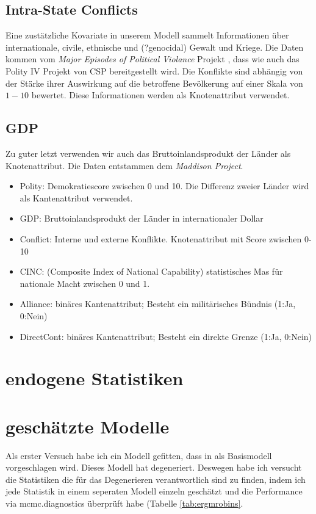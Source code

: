 \documentclass[a4paper,ngerman,oneside,titlepage,bibliography=totoc,11pt]{scrreprt}
\begin{document}
\subsection{Intra-State Conflicts}
Eine zustätzliche Kovariate in unserem Modell sammelt Informationen über internationale, civile, ethnische und (?genocidal) Gewalt und Kriege. Die Daten kommen vom \emph{Major Episodes of Political Violance} Projekt \cite{conflict}, dass wie auch das Polity IV Projekt von CSP bereitgestellt wird. Die Konflikte sind abhängig von der Stärke ihrer Auswirkung auf die betroffene Bevölkerung auf einer Skala von $1-10$ bewertet. Diese Informationen werden als Knotenattribut verwendet.

\subsection{GDP}
Zu guter letzt verwenden wir auch das Bruttoinlandsprodukt der Länder als Knotenattribut. Die Daten entstammen dem \emph{Maddison Project}\cite{GDP}. 


\begin{itemize}
  \item Polity: Demokratiescore zwischen 0 und 10. Die Differenz zweier Länder wird als Kantenattribut verwendet.
  \item GDP: Bruttoinlandsprodukt der Länder in internationaler Dollar
  \item Conflict: Interne und externe Konflikte. Knotenattribut mit Score zwischen 0-10
  \item CINC: (Composite Index of National Capability) statistisches Mas für nationale Macht zwischen 0 und 1.
  \item Alliance: binäres Kantenattribut; Besteht ein militärisches Bündnis (1:Ja, 0:Nein)
  \item DirectCont: binäres Kantenattribut; Besteht ein direkte Grenze (1:Ja, 0:Nein)
\end{itemize}
\section{endogene Statistiken}
\section{geschätzte Modelle}
Als erster Versuch habe ich ein Modell gefitten, dass in \cite{lkr12} als Basismodell vorgeschlagen wird. Dieses Modell hat degeneriert. Deswegen habe ich versucht die Statistiken die für das Degenerieren verantwortlich sind zu finden, indem ich jede Statistik in einem seperaten Modell einzeln geschätzt und die Performance via mcmc.diagnostics überprüft habe (Tabelle \ref{tab:ergmrobins}.
\end{document}
